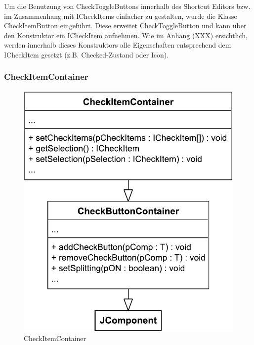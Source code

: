 \vspace{-5px}

Um die Benutzung von CheckToggleButtons innerhalb des Shortcut Editors bzw. im Zusammenhang mit ICheckItems einfacher zu gestalten, wurde die Klasse CheckItemButton eingeführt. Diese erweitet CheckToggleButton und kann über den Konstruktor ein ICheckItem aufnehmen. Wie im Anhang (XXX) ersichtlich, werden innerhalb dieses Konstruktors alle Eigenschaften entsprechend dem ICheckItem gesetzt (z.B. Checked-Zustand oder Icon).

\vspace{-5px}

\subsubsection{CheckItemContainer}

\begin{figure}
	\vspace{-12px}
	\centering
	\includegraphics[width=.95\linewidth]{../graphic/diagrams/CD_CheckItemContainer/CD_CheckItemContainer}
	\caption{CheckItemContainer}
	\label{fig:cdcheckitemcontainer}
\end{figure}

